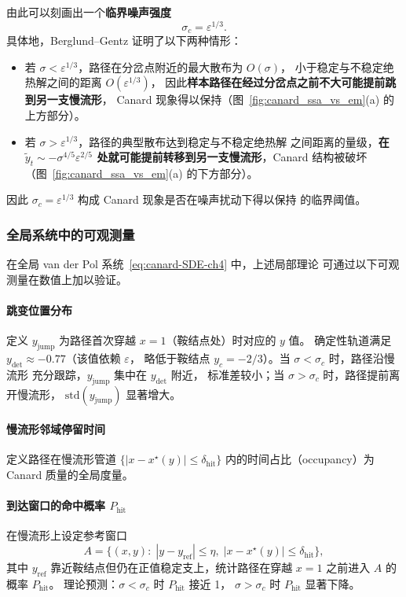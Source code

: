 由此可以刻画出一个\textbf{临界噪声强度}
\begin{equation}\label{eq:sigma-c}
	\sigma_c = \varepsilon^{1/3}.
\end{equation}
具体地，Berglund--Gentz 证明了以下两种情形：
\begin{itemize}
	\item 若 $\sigma < \varepsilon^{1/3}$，路径在分岔点附近的最大散布为 $O(\sigma)$，
	小于稳定与不稳定绝热解之间的距离 $O(\varepsilon^{1/3})$，
	因此\textbf{样本路径在经过分岔点之前不大可能提前跳到另一支慢流形}，
	Canard 现象得以保持（图~\ref{fig:canard_ssa_vs_em}(a) 的上方部分）。
	\item 若 $\sigma > \varepsilon^{1/3}$，路径的典型散布达到稳定与不稳定绝热解
	之间距离的量级，\textbf{在 $\tilde y_t \sim -\sigma^{4/5}\varepsilon^{2/5}$
		处就可能提前转移到另一支慢流形}，Canard 结构被破坏
	（图~\ref{fig:canard_ssa_vs_em}(a) 的下方部分）。
\end{itemize}
因此 $\sigma_c = \varepsilon^{1/3}$ 构成 Canard 现象是否在噪声扰动下得以保持
的临界阈值。

\subsubsection{全局系统中的可观测量}

在全局 van der Pol 系统~\eqref{eq:canard-SDE-ch4} 中，上述局部理论
可通过以下可观测量在数值上加以验证。

\paragraph{跳变位置分布}
定义 $y_\mathrm{jump}$ 为路径首次穿越 $x=1$（鞍结点处）时对应的 $y$ 值。
确定性轨道满足 $y_\mathrm{det} \approx -0.77$（该值依赖 $\varepsilon$，
略低于鞍结点 $y_c = -2/3$）。当 $\sigma < \sigma_c$ 时，路径沿慢流形
充分跟踪，$y_\mathrm{jump}$ 集中在 $y_\mathrm{det}$ 附近，
标准差较小；当 $\sigma > \sigma_c$ 时，路径提前离开慢流形，
$\mathrm{std}(y_\mathrm{jump})$ 显著增大。

\paragraph{慢流形邻域停留时间}
定义路径在慢流形管道 $\{|x - x^\star(y)| \leq \delta_\mathrm{hit}\}$
内的时间占比（occupancy）为 Canard 质量的全局度量。

\paragraph{到达窗口的命中概率 $P_\mathrm{hit}$}
在慢流形上设定参考窗口
\begin{equation}\label{eq:window-A}
	A = \bigl\{(x,y):\; |y - y_\mathrm{ref}|\leq\eta,\;
	|x - x^\star(y)|\leq\delta_\mathrm{hit}\bigr\},
\end{equation}
其中 $y_\mathrm{ref}$ 靠近鞍结点但仍在正值稳定支上，统计路径在穿越
$x=1$ 之前进入 $A$ 的概率 $P_\mathrm{hit}$。
理论预测：$\sigma < \sigma_c$ 时 $P_\mathrm{hit}$ 接近 1，
$\sigma > \sigma_c$ 时 $P_\mathrm{hit}$ 显著下降。


